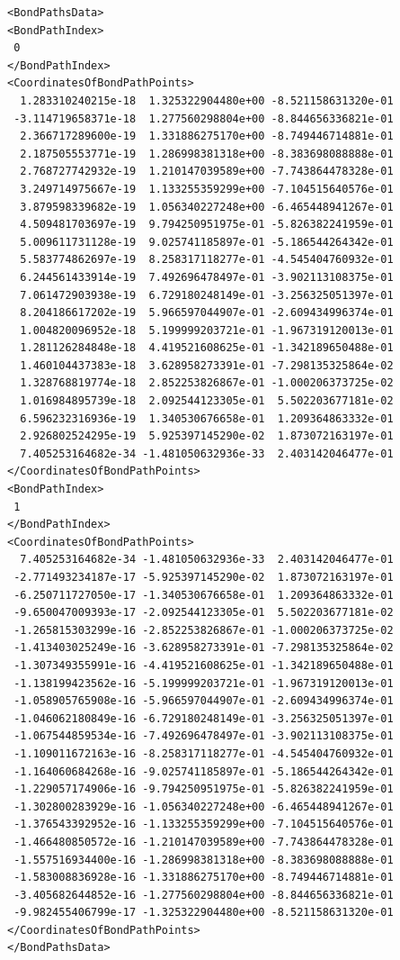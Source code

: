 \begin{verbatim}
<BondPathsData>
<BondPathIndex>
 0
</BondPathIndex>
<CoordinatesOfBondPathPoints>
  1.283310240215e-18  1.325322904480e+00 -8.521158631320e-01
 -3.114719658371e-18  1.277560298804e+00 -8.844656336821e-01
  2.366717289600e-19  1.331886275170e+00 -8.749446714881e-01
  2.187505553771e-19  1.286998381318e+00 -8.383698088888e-01
  2.768727742932e-19  1.210147039589e+00 -7.743864478328e-01
  3.249714975667e-19  1.133255359299e+00 -7.104515640576e-01
  3.879598339682e-19  1.056340227248e+00 -6.465448941267e-01
  4.509481703697e-19  9.794250951975e-01 -5.826382241959e-01
  5.009611731128e-19  9.025741185897e-01 -5.186544264342e-01
  5.583774862697e-19  8.258317118277e-01 -4.545404760932e-01
  6.244561433914e-19  7.492696478497e-01 -3.902113108375e-01
  7.061472903938e-19  6.729180248149e-01 -3.256325051397e-01
  8.204186617202e-19  5.966597044907e-01 -2.609434996374e-01
  1.004820096952e-18  5.199999203721e-01 -1.967319120013e-01
  1.281126284848e-18  4.419521608625e-01 -1.342189650488e-01
  1.460104437383e-18  3.628958273391e-01 -7.298135325864e-02
  1.328768819774e-18  2.852253826867e-01 -1.000206373725e-02
  1.016984895739e-18  2.092544123305e-01  5.502203677181e-02
  6.596232316936e-19  1.340530676658e-01  1.209364863332e-01
  2.926802524295e-19  5.925397145290e-02  1.873072163197e-01
  7.405253164682e-34 -1.481050632936e-33  2.403142046477e-01
</CoordinatesOfBondPathPoints>
<BondPathIndex>
 1
</BondPathIndex>
<CoordinatesOfBondPathPoints>
  7.405253164682e-34 -1.481050632936e-33  2.403142046477e-01
 -2.771493234187e-17 -5.925397145290e-02  1.873072163197e-01
 -6.250711727050e-17 -1.340530676658e-01  1.209364863332e-01
 -9.650047009393e-17 -2.092544123305e-01  5.502203677181e-02
 -1.265815303299e-16 -2.852253826867e-01 -1.000206373725e-02
 -1.413403025249e-16 -3.628958273391e-01 -7.298135325864e-02
 -1.307349355991e-16 -4.419521608625e-01 -1.342189650488e-01
 -1.138199423562e-16 -5.199999203721e-01 -1.967319120013e-01
 -1.058905765908e-16 -5.966597044907e-01 -2.609434996374e-01
 -1.046062180849e-16 -6.729180248149e-01 -3.256325051397e-01
 -1.067544859534e-16 -7.492696478497e-01 -3.902113108375e-01
 -1.109011672163e-16 -8.258317118277e-01 -4.545404760932e-01
 -1.164060684268e-16 -9.025741185897e-01 -5.186544264342e-01
 -1.229057174906e-16 -9.794250951975e-01 -5.826382241959e-01
 -1.302800283929e-16 -1.056340227248e+00 -6.465448941267e-01
 -1.376543392952e-16 -1.133255359299e+00 -7.104515640576e-01
 -1.466480850572e-16 -1.210147039589e+00 -7.743864478328e-01
 -1.557516934400e-16 -1.286998381318e+00 -8.383698088888e-01
 -1.583008836928e-16 -1.331886275170e+00 -8.749446714881e-01
 -3.405682644852e-16 -1.277560298804e+00 -8.844656336821e-01
 -9.982455406799e-17 -1.325322904480e+00 -8.521158631320e-01
</CoordinatesOfBondPathPoints>
</BondPathsData>

\end{verbatim}

